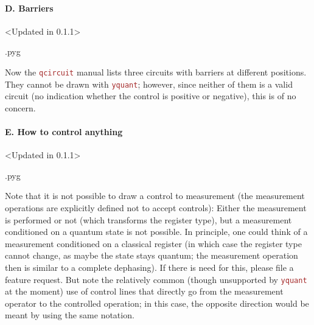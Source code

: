 \documentclass{scrartcl}
\makeatletter
\newenvironment{codeexample}{%
   \VerbatimEnvironment%
   \let\FVB@VerbatimOut\minted@FVB@VerbatimOut
   \let\FVE@VerbatimOut\minted@FVE@VerbatimOut
   \minted@configlang{tex}%
   \minted@fvset
   \begin{VerbatimOut}[codes={\catcode`\^^I=12},firstline,lastline]{\minted@jobname.pyg}%
}{
   \end{VerbatimOut}%
   \minted@langlinenoson%
   \savebox\codeexamplebox{ \minted@jobname.pyg}%
   \ifdim\wd\codeexamplebox>\dimexpr.5\linewidth-3mm\relax%
      \wd\codeexamplebox=.5\linewidth%
   \else%
      \wd\codeexamplebox=\dimexpr\wd\codeexamplebox+3mm\relax%
   \fi%
   \noindent\begin{minipage}{\wd\codeexamplebox}%
      \centering%
      \usebox\codeexamplebox%
   \end{minipage}%
   \begin{minipage}{\dimexpr\linewidth-\wd\codeexamplebox\relax}%
      \expandafter\minted@pygmentize\expandafter{\minted@lang}%
   \end{minipage}%
   \minted@langlinenosoff%
   \par%
}
\def\pkg#1{\textcolor{brown}{\texttt{#1}}}
\def\Yquant{\pkg{yquant}}
\makeatother
\begin{document}
            \paragraph{D. Barriers}\leavevmode
               \begin{example}<Updated in 0.1.1>
                  \begin{codeexample}
                  \end{codeexample}
               \end{example}
               Now the \pkg{qcircuit} manual lists three circuits with barriers at different positions.
               They cannot be drawn with \Yquant; however, since neither of them is a valid circuit (no indication whether the control is positive or negative), this is of no concern.

            \paragraph{E. How to control anything}\leavevmode
               \begin{example}<Updated in 0.1.1>
                  \begin{codeexample}
                  \end{codeexample}
                  Note that it is not possible to draw a control to measurement (the measurement operations are explicitly defined not to accept controls): Either the measurement is performed or not (which transforms the register type), but a measurement conditioned on a quantum state is not possible.
                  In principle, one could think of a measurement conditioned on a classical register (in which case the register type cannot change, as maybe the state stays quantum; the measurement operation then is similar to a complete dephasing).
                  If there is need for this, please file a feature request.
                  But note the relatively common (though unsupported by \Yquant{} at the moment) use of control lines that directly go from the measurement operator to the controlled operation; in this case, the opposite direction would be meant by using the same notation.
               \end{example}
\end{document}
